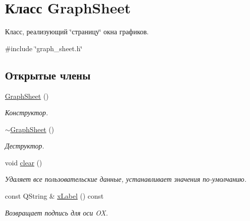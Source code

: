 \hypertarget{class_graph_sheet}{}\section{Класс Graph\+Sheet}
\label{class_graph_sheet}


Класс, реализующий \char`\"{}страницу\char`\"{} окна графиков.  




{\ttfamily \#include \char`\"{}graph\+\_\+sheet.\+h\char`\"{}}

\subsection*{Открытые члены}
\begin{DoxyCompactItemize}
\item 
\hypertarget{class_graph_sheet_aad9e497cfb489af37227147397ab021b}{}\label{class_graph_sheet_aad9e497cfb489af37227147397ab021b} 
\hyperlink{class_graph_sheet_aad9e497cfb489af37227147397ab021b}{Graph\+Sheet} ()
\begin{DoxyCompactList}\small\item\em Конструктор. \end{DoxyCompactList}\item 
\hypertarget{class_graph_sheet_ae4511be48b18851127b544cbf099d8e4}{}\label{class_graph_sheet_ae4511be48b18851127b544cbf099d8e4} 
\hyperlink{class_graph_sheet_ae4511be48b18851127b544cbf099d8e4}{$\sim$\+Graph\+Sheet} ()
\begin{DoxyCompactList}\small\item\em Деструктор. \end{DoxyCompactList}\item 
\hypertarget{class_graph_sheet_a63677ef6de3a86eb27bef2ae91993a7c}{}\label{class_graph_sheet_a63677ef6de3a86eb27bef2ae91993a7c} 
void \hyperlink{class_graph_sheet_a63677ef6de3a86eb27bef2ae91993a7c}{clear} ()
\begin{DoxyCompactList}\small\item\em Удаляет все пользовательские данные, устанавливает значения по-\/умолчанию. \end{DoxyCompactList}\item 
\hypertarget{class_graph_sheet_a3684092b56d4b44c41a2d50d3ba3346e}{}\label{class_graph_sheet_a3684092b56d4b44c41a2d50d3ba3346e} 
const Q\+String \& \hyperlink{class_graph_sheet_a3684092b56d4b44c41a2d50d3ba3346e}{x\+Label} () const
\begin{DoxyCompactList}\small\item\em Возвращает подпись для оси OX. \end{DoxyCompactList}\item 

\end{DoxyCompactItemize}
